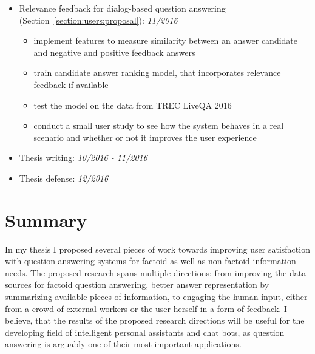\begin{itemize}
\item Relevance feedback for dialog-based question answering (Section~\ref{section:users:proposal}): \textit{11/2016}
	\begin{itemize}
	\item implement features to measure similarity between an answer candidate and negative and positive feedback answers
	\item train candidate answer ranking model, that incorporates relevance feedback if available
	\item test the model on the data from TREC LiveQA 2016
	\item conduct a small user study to see how the system behaves in a real scenario and whether or not it improves the user experience
	\end{itemize}

\item Thesis writing: \textit{10/2016 - 11/2016}
\item Thesis defense: \textit{12/2016}
\end{itemize}

\section{Summary}
\label{section:proposal:summary}

In my thesis I proposed several pieces of work towards improving user satisfaction with question answering systems for factoid as well as non-factoid information needs.
The proposed research spans multiple directions: from improving the data sources for factoid question answering, better answer representation by summarizing available pieces of information, to engaging the human input, either from a crowd of external workers or the user herself in a form of feedback.
I believe, that the results of the proposed research directions will be useful for the developing field of intelligent personal assistants and chat bots, as question answering is arguably one of their most important applications.
